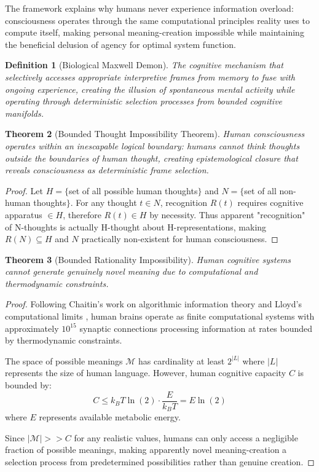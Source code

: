 \documentclass[12pt,a4paper]{article}
\newtheorem{theorem}{Theorem}[section]
\newtheorem{definition}[theorem]{Definition}
\begin{document}
The framework explains why humans never experience information overload: consciousness operates through the same computational principles reality uses to compute itself, making personal meaning-creation impossible while maintaining the beneficial delusion of agency for optimal system function.

\begin{definition}[Biological Maxwell Demon]
The cognitive mechanism that selectively accesses appropriate interpretive frames from memory to fuse with ongoing experience, creating the illusion of spontaneous mental activity while operating through deterministic selection processes from bounded cognitive manifolds.
\end{definition}

\begin{theorem}[Bounded Thought Impossibility Theorem]
Human consciousness operates within an inescapable logical boundary: humans cannot think thoughts outside the boundaries of human thought, creating epistemological closure that reveals consciousness as deterministic frame selection.
\end{theorem}

\begin{proof}
Let $H = \{$set of all possible human thoughts$\}$ and $N = \{$set of all non-human thoughts$\}$. For any thought $t \in N$, recognition $R(t)$ requires cognitive apparatus $\in H$, therefore $R(t) \in H$ by necessity. Thus apparent "recognition" of N-thoughts is actually H-thought about H-representations, making $R(N) \subseteq H$ and $N$ practically non-existent for human consciousness.
\end{proof}

\begin{theorem}[Bounded Rationality Impossibility]
Human cognitive systems cannot generate genuinely novel meaning due to computational and thermodynamic constraints.
\end{theorem}

\begin{proof}
Following Chaitin's work on algorithmic information theory \citep{chaitin2005meta} and Lloyd's computational limits \citep{lloyd2000ultimate}, human brains operate as finite computational systems with approximately $10^{15}$ synaptic connections processing information at rates bounded by thermodynamic constraints.

The space of possible meanings $\mathcal{M}$ has cardinality at least $2^{|L|}$ where $|L|$ represents the size of human language. However, human cognitive capacity $C$ is bounded by:
\begin{equation}
C \leq k_B T \ln(2) \cdot \frac{E}{k_B T} = E \ln(2)
\end{equation}
where $E$ represents available metabolic energy.

Since $|\mathcal{M}| >> C$ for any realistic values, humans can only access a negligible fraction of possible meanings, making apparently novel meaning-creation a selection process from predetermined possibilities rather than genuine creation.
\end{proof}
\end{document}
